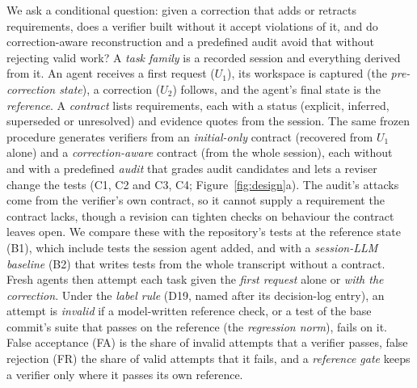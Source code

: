 We ask a conditional question: given a correction that adds or retracts requirements, does a verifier built without it accept violations of it, and do correction-aware reconstruction and a predefined audit avoid that without rejecting valid work? A \emph{task family} is a recorded session and everything derived from it. An agent receives a first request ($U_1$), its workspace is captured (the \emph{pre-correction state}), a correction ($U_2$) follows, and the agent's final state is the \emph{reference}. A \emph{contract} lists requirements, each with a status (explicit, inferred, superseded or unresolved) and evidence quotes from the session. The same frozen procedure generates verifiers from an \emph{initial-only} contract (recovered from $U_1$ alone) and a \emph{correction-aware} contract (from the whole session), each without and with a predefined \emph{audit} that grades audit candidates and lets a reviser change the tests (C1, C2 and C3, C4; Figure~\ref{fig:design}a). The audit's attacks come from the verifier's own contract, so it cannot supply a requirement the contract lacks, though a revision can tighten checks on behaviour the contract leaves open. We compare these with the repository's tests at the reference state (B1), which include tests the session agent added, and with a \emph{session-LLM baseline} (B2) that writes tests from the whole transcript without a contract. Fresh agents then attempt each task given the \emph{first request} alone or \emph{with the correction}. Under the \emph{label rule} (D19, named after its decision-log entry), an attempt is \emph{invalid} if a model-written reference check, or a test of the base commit's suite that passes on the reference (the \emph{regression norm}), fails on it. False acceptance (FA) is the share of invalid attempts that a verifier passes, false rejection (FR) the share of valid attempts that it fails, and a \emph{reference gate} keeps a verifier only where it passes its own reference.


